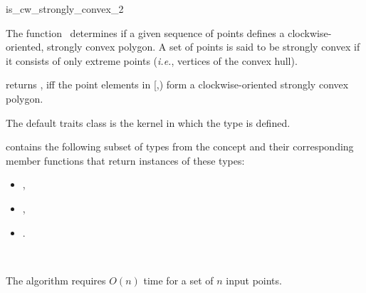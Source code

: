 

\begin{ccRefFunction}{is_cw_strongly_convex_2}  

\ccDefinition
  
The function \ccRefName\ determines if a given sequence of points defines
a clockwise-oriented, strongly convex polygon.  
A set of points is said to be strongly convex %
 if it consists of only extreme points
(\textit{i.e.}, vertices of the convex hull).



           {returns , iff the point elements in 
            [,)
            form a clockwise-oriented strongly convex polygon.
           }

The default traits class  is the kernel in which the 
type  is defined.


 contains the following subset of types from
the concept  and their corresponding member
functions that return instances of these types:
            \begin{itemize}
	        \item {},
                \item {}, 
                \item {}.
            \end{itemize}


\ccSeeAlso

 \\

\ccImplementation
The algorithm requires $O(n)$ time for a set of $n$ input points.

\end{ccRefFunction}


